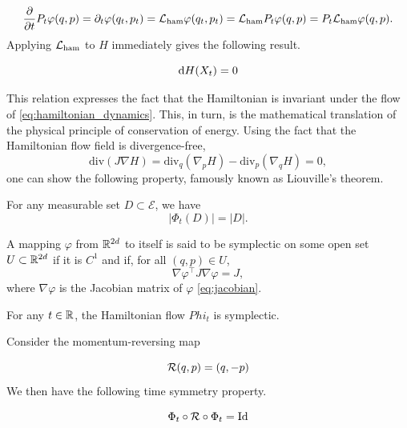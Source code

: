     $$ \frac \partial{\partial t} P_t \varphi (q,p)= \partial_t \varphi(q_t,p_t)= \mathcal{L}_{\rm ham} \varphi(q_t,p_t)=\mathcal{L}_{\rm ham} P_t \varphi(q,p)=P_t\mathcal{L}_{\rm ham} \varphi(q,p).$$
    Applying $\mathcal{L}_{\rm ham}$ to $H$ immediately gives the following result.
\begin{prop}
    \begin{equation}
    \label{eq:energy_conservation} \text d H(X_t)=0
    \end{equation}
\end{prop}
This relation expresses the fact that the Hamiltonian is invariant under the flow of \eqref{eq:hamiltonian_dynamics}. This, in turn, is the mathematical translation of the physical principle of conservation of energy.
Using the fact that the Hamiltonian flow field is divergence-free,
\begin{equation}
        \label{eq:hamiltonian_flow_divergence_free}
        \mathrm{div}\left(J\nabla H\right)=\mathrm{div}_q\left(\nabla_p H\right)-\mathrm{div}_p\left(\nabla_q H\right)=0,
\end{equation}
one can show the following property, famously known as Liouville's theorem.
\begin{prop}
    For any measurable set $D\subset \mathcal E$, we have
    \begin{equation}
        \label{eq:conservation_of_volume}
        |\Phi_t(D)|=|D|.
    \end{equation}
\end{prop}

\begin{definition}[Symplecticity]
    A mapping $\varphi$ from $\mathbb{R}^{2d}$ to itself is said to be symplectic on some open set $U\subset \mathbb{R}^{2d}$ if it is $C^1$ and if, for all $(q,p)\in U$,
    \[\nabla \varphi^\intercal J\nabla \varphi=J,\]
    where $\nabla \varphi$ is the Jacobian matrix of $\varphi$ \eqref{eq:jacobian}.
\end{definition}

\begin{prop}
    For any $t\in \mathbb{R}$, the Hamiltonian flow $Phi_t$ is symplectic.
\end{prop}
Consider the momentum-reversing map

\begin{equation}
    \label{eq:momentum_reversing}
    \mathcal{R}(q,p)=(q,-p)
\end{equation}
We then have the following time symmetry property.
\begin{prop}
    \begin{equation}
        \Phi_t \circ \mathcal{R} \circ \Phi_t=\mathrm{Id}
    \end{equation}
\end{prop}


